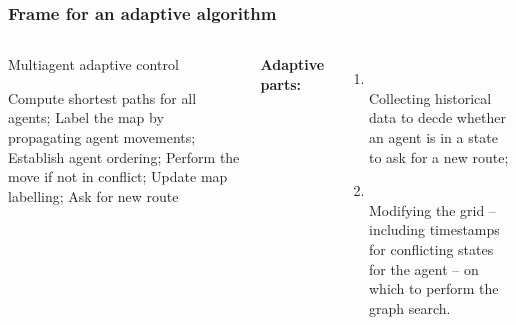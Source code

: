 \documentclass[12pt,aspectratio=169]{beamer}
\begin{document}
\begin{frame}[fragile,t]
  \frametitle{Frame for an adaptive algorithm}

{
\begin{columns}

\vspace*{-0.7cm}
\begin{minipage}{\linewidth}
  \begin{alertblock}{Multiagent adaptive control}
  \begin{algorithmic}[1]
  \Statex
  \State Compute shortest paths for \alert{all agents};
  \State Label the map by propagating agent movements;
  \State Establish agent ordering;
  \State Perform the move if not in conflict;
  \State Update map labelling;
  \State Ask for new route
  \EndIf
  \EndFor
  \EndWhile
  \end{algorithmic}
  \end{alertblock}
\end{minipage}

\vspace*{-0.5cm}

\textbf{Adaptive parts:}
\begin{enumerate}
\item {}\\
  Collecting historical data to decde whether an agent is in \alert{a state} to ask for a new route;\vspace*{.5cm}

\item {}\\
  Modifying the grid -- including timestamps for conflicting states for the agent -- on which to perform the graph search.
\end{enumerate}
\end{columns}

}
\end{frame}
\end{document}
